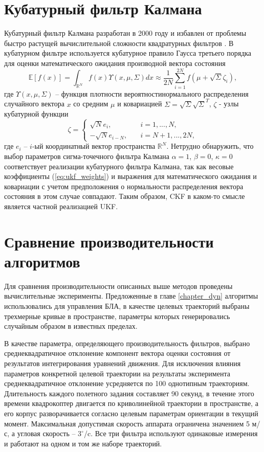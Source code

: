 \section{Кубатурный фильтр Калмана}
Кубатурный фильтр Калмана разработан в 2000 году и избавлен от
проблемы быстро растущей вычислительной сложности квадратурных фильтров \cite{Arasaratnam}.
В кубатурном фильтре используется кубатурное правило Гаусса третьего порядка для
оценки математического ожидания производной вектора состояния
\begin{equation*}
\mathbb{E}[f(x)] = \int_{\mathbb{R}^N}^{} f(x) \Upsilon(x, \mu, \Sigma) dx \approx \frac{1}{2N} \sum_{i=1}^{2N}f(\mu + \sqrt \Sigma \zeta_i),
\end{equation*}
где $\Upsilon(x, \mu, \Sigma)$ -- функция плотности вероятностинормального распределения случайного вектора $x$
со средним $\mu$ и ковариацией $\Sigma = \sqrt \Sigma \sqrt{\Sigma}^T$, $\zeta$ - узлы кубатурной функции
\begin{equation*}
\zeta =
\begin{cases}
\sqrt N e_i, & \quad i = 1,...,N,\\
-\sqrt N e_{i-N}, &\quad i = N+1,...,2N,
\end{cases}
\end{equation*}
где $e_i$ -- $i$-ый координатный вектор пространства $\mathbb R^N$.
Нетрудно обнаружить, что  выбор параметров сигма-точечного фильтра Калмана
$\alpha=1$, $\beta=0$, $\kappa=0$
соответствует реализации кубатурного фильтра Калмана,
так как весовые коэффициенты (\ref{eq:ukf_weights})
и выражения для математического ожидания и ковариации с учетом предположения
о нормальности распределения вектора состояния в этом случае совпадают.
Таким образом, CKF в каком-то смысле является частной реализацией UKF.

\section{Сравнение производительности алгоритмов}

Для сравнения производительности описанных выше методов проведены вычислительные эксперименты.
Предложенные в главе \ref{chapter_dyn} алгоритмы использовались для управления БЛА, в качестве целевых траекторий выбраны трехмерные кривые в пространстве, параметры которых генерировались случайным образом в известных пределах.

В качестве параметра, определяющего производительность фильтров,
выбрано среднеквадратичное отклонение компонент вектора оценки состояния от результатов интегрирования уравнений движения.
Для исключения влияния параметров конкретной целевой траектории на результаты эксперимента
среднеквадратичное отклонение усредняется по 100 однотипным траекториям.
Длительность каждого полетного задания составляет 90 секунд, в течение этого времени квадрокоптер
двигается по криволинейной траектории в пространстве,
а его корпус разворачивается согласно целевым параметрам ориентации в текущий момент.
Максимальная допустимая скорость аппарата ограничена значением 5 м/с,
а угловая скорость -- $3^\circ$/c. Все три фильтра используют одинаковые измерения
и работают на одном и том же наборе траекторий.

